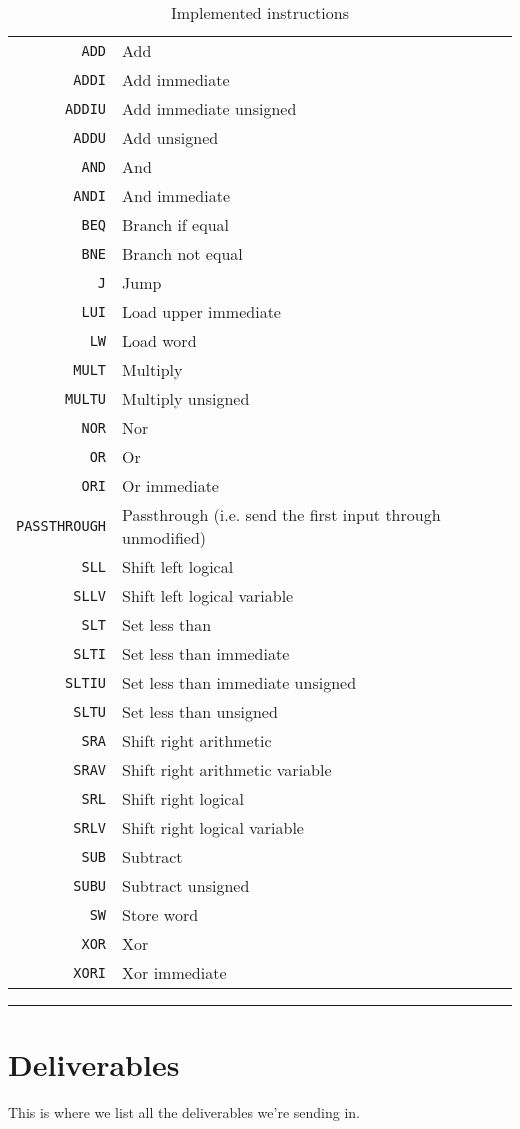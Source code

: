 \begin{table}
    \begin{center}
        \begin{tabular}{r|l}
            \texttt{ADD} & Add \\
            \texttt{ADDI} & Add immediate \\
            \texttt{ADDIU} & Add immediate unsigned \\
            \texttt{ADDU} & Add unsigned \\
            \texttt{AND} & And \\
            \texttt{ANDI} & And immediate \\
            \texttt{BEQ} & Branch if equal \\
            \texttt{BNE} & Branch not equal \\
            \texttt{J} & Jump \\
            \texttt{LUI} & Load upper immediate \\
            \texttt{LW} & Load word \\
            \texttt{MULT} & Multiply \\
            \texttt{MULTU} & Multiply unsigned \\
            \texttt{NOR} & Nor \\
            \texttt{OR} & Or \\
            \texttt{ORI} & Or immediate \\
            \texttt{PASSTHROUGH} & Passthrough (i.e. send the first input through unmodified) \\
            \texttt{SLL} & Shift left logical \\
            \texttt{SLLV} & Shift left logical variable \\
            \texttt{SLT} & Set less than \\
            \texttt{SLTI} & Set less than immediate \\
            \texttt{SLTIU} & Set less than immediate unsigned \\
            \texttt{SLTU} & Set less than unsigned \\
            \texttt{SRA} & Shift right arithmetic \\
            \texttt{SRAV} & Shift right arithmetic variable \\
            \texttt{SRL} & Shift right logical \\
            \texttt{SRLV} & Shift right logical variable \\
            \texttt{SUB} & Subtract \\
            \texttt{SUBU} & Subtract unsigned \\
            \texttt{SW} & Store word \\
            \texttt{XOR} & Xor \\
            \texttt{XORI} & Xor immediate \\
        \end{tabular}
        \smallskip
        \hrule
        \smallskip
        \caption{Implemented instructions}
        \label{table:implemented-instructions}
    \end{center}
\end{table}

\section{Deliverables}

This is where we list all the deliverables we're sending in.
